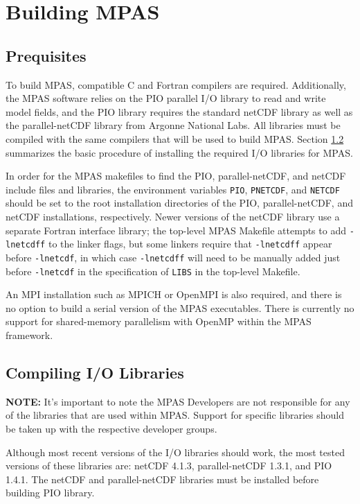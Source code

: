 \chapter{Building MPAS}
\label{chap:mpas_build_instructions}

\section{Prequisites}

To build MPAS, compatible C and Fortran compilers are required. Additionally, the MPAS software relies on the PIO parallel I/O library to read and write model fields, and the PIO library requires the standard netCDF library as well as the parallel-netCDF library from Argonne National Labs. All libraries must be compiled with the same compilers that will be used to build MPAS. Section \ref{sec:build_io} summarizes the basic procedure of installing the required I/O libraries for MPAS.

In order for the MPAS makefiles to find the PIO, parallel-netCDF, and netCDF include files and libraries, the environment variables {\tt PIO}, {\tt PNETCDF}, and {\tt NETCDF} should be set to the root installation directories of the PIO, parallel-netCDF, and netCDF installations, respectively. Newer versions of the netCDF library use a separate Fortran interface library; the top-level MPAS Makefile attempts to add {\tt -lnetcdff} to the linker flags, but some linkers require that {\tt -lnetcdff} appear before {\tt -lnetcdf}, in which case {\tt -lnetcdff} will need to be manually added just before {\tt -lnetcdf} in the specification of {\tt LIBS} in the top-level Makefile.

An MPI installation such as MPICH or OpenMPI is also required, and there is no option to build a serial version of the MPAS executables. There is currently no support for shared-memory parallelism with OpenMP within the MPAS framework.


\section{Compiling I/O Libraries}
\label{sec:build_io}

{\bf NOTE:} It's important to note the MPAS Developers are not responsible for any of the libraries that are used within MPAS. Support for specific libraries should be taken up with the respective developer groups.

Although most recent versions of the I/O libraries should work, the most tested versions of these libraries are: netCDF 4.1.3, parallel-netCDF 1.3.1, and PIO 1.4.1. The netCDF and parallel-netCDF libraries must be installed before building PIO library.

